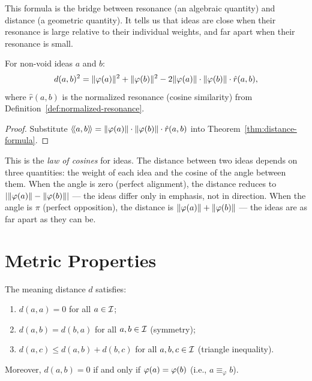 This formula is the bridge between resonance (an algebraic quantity) and
distance (a geometric quantity). It tells us that ideas are close when their
resonance is large relative to their individual weights, and far apart when
their resonance is small.

\begin{corollary}
\label{cor:distance-cosine}
For non-void ideas $a$ and $b$:
\[
  d(a, b)^2 = \lVert \varphi(a) \rVert^2 + \lVert \varphi(b) \rVert^2
    - 2\lVert \varphi(a) \rVert \cdot \lVert \varphi(b) \rVert \cdot \hat{r}(a, b),
\]
where $\hat{r}(a, b)$ is the normalized resonance (cosine similarity) from
Definition~\ref{def:normalized-resonance}.
\end{corollary}

\begin{proof}
Substitute $\langle\!\langle a, b \rangle\!\rangle = \lVert \varphi(a) \rVert \cdot \lVert \varphi(b) \rVert \cdot
\hat{r}(a, b)$ into Theorem~\ref{thm:distance-formula}.
\end{proof}

This is the \emph{law of cosines} for ideas. The distance between two ideas
depends on three quantities: the weight of each idea and the cosine of the
angle between them. When the angle is zero (perfect alignment), the distance
reduces to $|\lVert \varphi(a) \rVert - \lVert \varphi(b) \rVert|$ --- the ideas differ only in
emphasis, not in direction. When the angle is $\pi$ (perfect opposition), the
distance is $\lVert \varphi(a) \rVert + \lVert \varphi(b) \rVert$ --- the ideas are as far apart
as they can be.


\section{Metric Properties}

\begin{theorem}[$d$ is a Pseudometric]
\label{thm:pseudometric}
The meaning distance $d$ satisfies:
\begin{enumerate}
\item $d(a, a) = 0$ for all $a \in \mathcal{I}$;
\item $d(a, b) = d(b, a)$ for all $a, b \in \mathcal{I}$ (symmetry);
\item $d(a, c) \leq d(a, b) + d(b, c)$ for all $a, b, c \in \mathcal{I}$ (triangle
inequality).
\end{enumerate}
Moreover, $d(a, b) = 0$ if and only if $\varphi(a) = \varphi(b)$ (i.e., $a
\equiv_\varphi b$).
\end{theorem}

